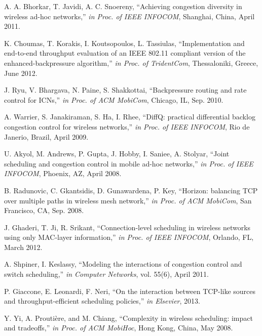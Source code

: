 \documentclass[conference]{IEEEtran}
\begin{document}
\begin{thebibliography}{}
 A. A. Bhorkar, T. Javidi, A. C. Snoereny, ``Achieving congestion diversity in wireless ad-hoc networks,'' {\em in Proc. of IEEE INFOCOM}, Shanghai, China, April 2011.

 K. Choumas, T. Korakis, I. Koutsopoulos, L. Tassiulas, ``Implementation and end-to-end throughput evaluation of an IEEE 802.11 compliant version of the enhanced-backpressure algorithm,'' {\em in Proc. of TridentCom},  Thessaloniki, Greece, June 2012.

 J. Ryu, V. Bhargava, N. Paine, S. Shakkottai, ``Backpressure routing and rate control for ICNs,'' {\em in Proc. of ACM MobiCom}, Chicago, IL, Sep. 2010.

 A. Warrier, S. Janakiraman, S. Ha, I. Rhee, ``DiffQ: practical differential backlog congestion control for wireless networks,'' {\em in Proc. of IEEE INFOCOM}, Rio de Janerio, Brazil, April 2009.

 U. Akyol, M. Andrews, P. Gupta, J. Hobby, I. Saniee, A. Stolyar, ``Joint scheduling and congestion control in mobile ad-hoc networks,'' {\em in Proc. of IEEE INFOCOM}, Phoenix, AZ, April 2008.

 B. Radunovic, C. Gkantsidis, D. Gunawardena, P. Key, ``Horizon: balancing TCP over multiple paths in wireless mesh network,'' {\em in Proc. of ACM MobiCom}, San Francisco, CA, Sep. 2008.

 J. Ghaderi, T. Ji, R. Srikant, ``Connection-level scheduling in wireless networks using only MAC-layer information,'' {\em in Proc. of IEEE INFOCOM}, Orlando, FL, March 2012.

 A. Shpiner, I. Keslassy, ``Modeling the interactions of congestion control and switch scheduling,'' {\em in Computer Networks}, vol. 55(6), April 2011.

 P. Giaccone, E. Leonardi, F. Neri, ``On the interaction between TCP-like sources and throughput-efficient scheduling policies,'' {\em in Elsevier}, 2013.

 Y. Yi, A. Prouti\`{e}re, and M. Chiang, ``Complexity in wireless scheduling: impact and tradeoffs,'' {\em in Proc. of ACM MobiHoc}, Hong Kong, China, May 2008.


\end{thebibliography}
\end{document}

